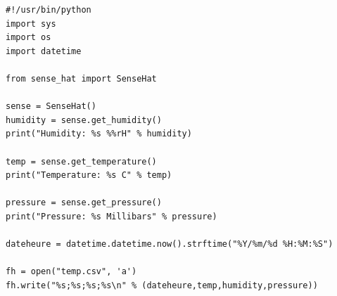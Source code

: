\begin{verbatim}
#!/usr/bin/python
import sys
import os
import datetime

from sense_hat import SenseHat

sense = SenseHat()
humidity = sense.get_humidity()
print("Humidity: %s %%rH" % humidity)

temp = sense.get_temperature()
print("Temperature: %s C" % temp)

pressure = sense.get_pressure()
print("Pressure: %s Millibars" % pressure)

dateheure = datetime.datetime.now().strftime("%Y/%m/%d %H:%M:%S")

fh = open("temp.csv", 'a')
fh.write("%s;%s;%s;%s\n" % (dateheure,temp,humidity,pressure))
\end{verbatim}


